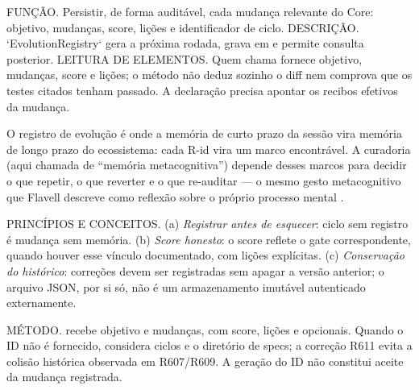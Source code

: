 \begin{descricao}
FUNÇÃO. Persistir, de forma auditável, cada mudança relevante do Core: objetivo,
mudanças, score, lições e identificador de ciclo. DESCRIÇÃO. `EvolutionRegistry`
gera a próxima rodada, grava em  e permite
consulta posterior. LEITURA DE ELEMENTOS. Quem chama  fornece
objetivo, mudanças, score e lições; o método não deduz sozinho o diff nem
comprova que os testes citados tenham passado. A declaração precisa apontar
os recibos efetivos da mudança.
\end{descricao}

O registro de evolução é onde a memória de curto prazo da sessão vira memória
de longo prazo do ecossistema: cada R-id vira um marco encontrável. A curadoria
(aqui chamada de ``memória metacognitiva'') depende desses marcos para decidir
o que repetir, o que reverter e o que re-auditar — o mesmo gesto metacognitivo
que Flavell descreve como reflexão sobre o próprio processo mental .\begin{conceito}
PRINCÍPIOS E CONCEITOS. (a) \emph{Registrar antes de esquecer}: ciclo sem
registro é mudança sem memória. (b) \emph{Score honesto}: o score reflete o
gate correspondente, quando houver esse vínculo documentado, com lições
explícitas. (c) \emph{Conservação do histórico}: correções devem ser
registradas sem apagar a versão anterior; o arquivo JSON, por si só, não é
um armazenamento imutável autenticado externamente.
\end{conceito}

\begin{metodo}
MÉTODO.  recebe objetivo e mudanças, com
score, lições e  opcionais. Quando o ID não é fornecido,
 considera ciclos e o diretório de specs; a correção
R611 evita a colisão histórica observada em R607/R609. A geração do ID não
constitui aceite da mudança registrada.
\end{metodo}

